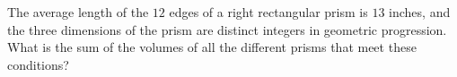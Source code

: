 The average length of the $12$ edges of a right rectangular prism is $13$ inches, and the three dimensions of the prism are distinct integers in geometric progression. What is the sum of the volumes of all the different prisms that meet these conditions?
